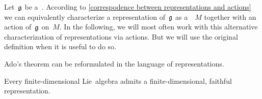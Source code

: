 \begin{fluff}
	Let~$\mathfrak{g}$ be a~\liealgebra{$\kf$}.
	According to \cref{correspodence between representations and actions} we can equivalently characterize a representation of~$\mathfrak{g}$ as a~\vectorspace{$\kf$}~$M$ together with an action of~$\mathfrak{g}$ on~$M$.
	In the following, we will most often work with this alternative characterization of representations via actions.
	But we will use the original definition when it is useful to do so.
\end{fluff}




\begin{fluff}
	Ado’s theorem can be reformulated in the language of representations.
\end{fluff}


\begin{theorem}
	Every finite-dimensional Lie~algebra admits a finite-\hspace{0pt}dimensional, faithful representation.
\end{theorem}


